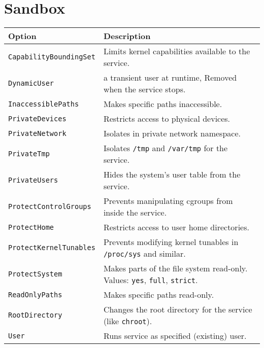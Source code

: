 \documentclass[openany, 12pt]{book}
\begin{document}
\chapter{Sandbox}

\begin{tabular}{ll}
	\toprule
	\textbf{Option}                & \textbf{Description}                                                                            \\
	\midrule
	\texttt{CapabilityBoundingSet} & Limits kernel capabilities available to the service.                                            \\
	\texttt{DynamicUser}           & a transient user at runtime, Removed when the service stops.                                    \\
	\texttt{InaccessiblePaths}     & Makes specific paths inaccessible.                                                              \\
	\texttt{PrivateDevices}        & Restricts access to physical devices.                                                           \\
	\texttt{PrivateNetwork}        & Isolates in private network namespace.                                                          \\
	\texttt{PrivateTmp}            & Isolates \texttt{/tmp} and \texttt{/var/tmp} for the service.                                   \\
	\texttt{PrivateUsers}          & Hides the system’s user table from the service.                                                 \\
	\texttt{ProtectControlGroups}  & Prevents manipulating cgroups from inside the service.                                          \\
	\texttt{ProtectHome}           & Restricts access to user home directories.                                                      \\
	\texttt{ProtectKernelTunables} & Prevents modifying kernel tunables in \texttt{/proc/sys} and similar.                           \\
	\texttt{ProtectSystem}         & Makes parts of the file system read-only. Values: \texttt{yes}, \texttt{full}, \texttt{strict}. \\
	\texttt{ReadOnlyPaths}         & Makes specific paths read-only.                                                                 \\
	\texttt{RootDirectory}         & Changes the root directory for the service (like \texttt{chroot}).                              \\
	\texttt{User}                  & Runs service as specified (existing) user.                                                      \\
	\bottomrule
\end{tabular}
\end{document}

